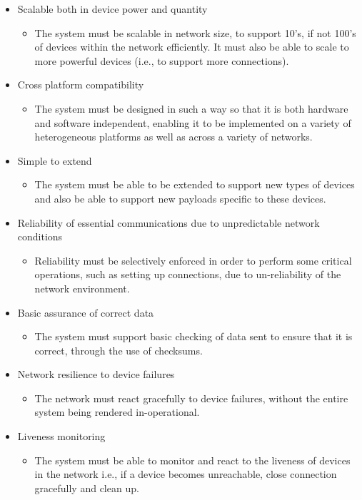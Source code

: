 \begin{itemize}
	\item Scalable both in device power and quantity
	\begin{itemize}
		\item The system must be scalable in network size, to support 10's, if not 100's of devices within the network efficiently. It must also be able to scale to more powerful devices (i.e., to support more connections).
	\end{itemize}
	\item Cross platform compatibility
	\begin{itemize}
		\item The system must be designed in such a way so that it is both hardware and software independent, enabling it to be implemented on a variety of heterogeneous platforms as well as across a variety of networks.
	\end{itemize}
	\item Simple to extend
	\begin{itemize}
		\item The system must be able to be extended to support new types of devices and also be able to support new payloads specific to these devices.
	\end{itemize}
	\item Reliability of essential communications due to unpredictable network conditions
	\begin{itemize}
		\item Reliability must be selectively enforced in order to perform some critical operations, such as setting up connections, due to un-reliability of the network environment.
	\end{itemize}
	\item Basic assurance of correct data
	\begin{itemize}
			\item The system must support basic checking of data sent to ensure that it is correct, through the use of checksums.
	\end{itemize}
	\item Network resilience to device failures
	\begin{itemize}
		\item The network must react gracefully to device failures, without the entire system being rendered in-operational.
	\end{itemize}
	\item Liveness monitoring
	\begin{itemize}
		\item The system must be able to monitor and react to the liveness of devices in the network i.e., if a device becomes unreachable, close connection gracefully and clean up.

\end{itemize}
\end{itemize}
